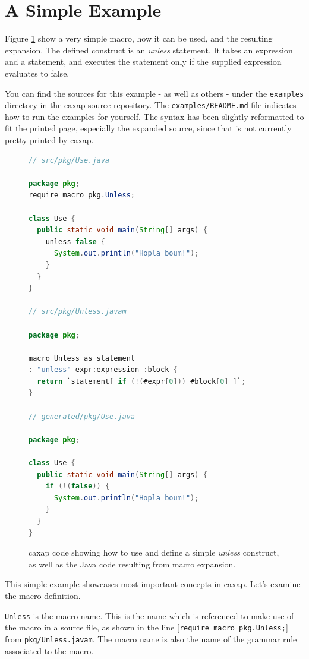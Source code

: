 \section{A Simple Example}
\label{simple_example}

Figure \ref{simple_macro_example} show a very simple macro, how it can be used,
and the resulting expansion. The defined construct is an \emph{unless}
statement. It takes an expression and a statement, and executes the statement
only if the supplied expression evaluates to false.

You can find the sources for this example - as well as others - under the
\texttt{examples} directory in the caxap source repository. The
\texttt{examples/README.md} file indicates how to run the examples for
yourself. The syntax has been slightly reformatted to fit the printed page,
especially the expanded source, since that is not currently pretty-printed by
caxap.

\begin{figure}[here]
\small
\begin{lstlisting}[language=Java, frame=single]
// src/pkg/Use.java

package pkg;
require macro pkg.Unless;

class Use {
  public static void main(String[] args) {
    unless false {
      System.out.println("Hopla boum!");
    }
  }
}

// src/pkg/Unless.javam

package pkg;

macro Unless as statement
: "unless" expr:expression :block {
  return `statement[ if (!(#expr[0])) #block[0] ]`;
}

// generated/pkg/Use.java

package pkg;

class Use {
  public static void main(String[] args) {
    if (!(false)) {
      System.out.println("Hopla boum!");
    }
  }
}

\end{lstlisting}
\caption{caxap code showing how to use and define a simple \emph{unless}
  construct, as well as the Java code resulting from macro expansion.}
\label{simple_macro_example}
\end{figure}

This simple example showcases most important concepts in caxap. Let's examine
the macro definition.

\texttt{Unless} is the macro name. This is the name which is referenced to make
use of the macro in a source file, as shown in the line [\texttt{require macro
  pkg.Unless;}] from \texttt{pkg/Unless.javam}. The macro name is also the name
of the grammar rule associated to the macro.

